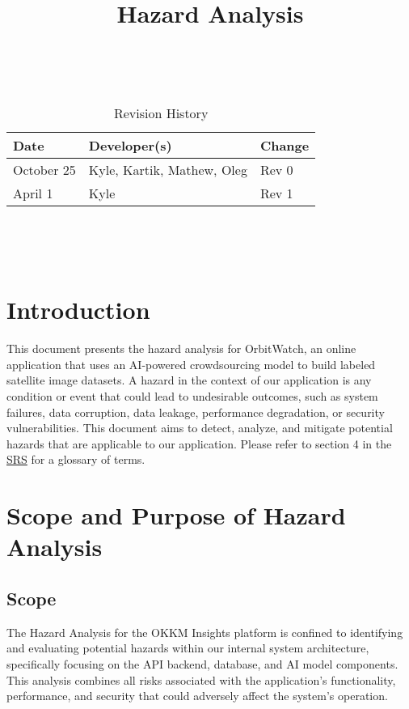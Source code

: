 \documentclass{article}
\title{Hazard Analysis\\\progname}
\author{\authname}
\date{}
\begin{document}
\maketitle
\thispagestyle{empty}

~\newpage


\begin{table}[hp]
\caption{Revision History} \label{TblRevisionHistory}
\begin{tabularx}{\textwidth}{llX}
\toprule
\textbf{Date} & \textbf{Developer(s)} & \textbf{Change}\\
\midrule
October 25 & Kyle, Kartik, Mathew, Oleg & Rev 0\\
April 1 & Kyle & Rev 1\\
\bottomrule
\end{tabularx}
\end{table}

~\newpage

\tableofcontents

~\newpage



\section{Introduction}
This document presents the hazard analysis for OrbitWatch, an online application that uses an AI-powered crowdsourcing model to build labeled satellite image datasets.
A hazard in the context of our application is any condition or event that could lead to undesirable outcomes, such as system failures, data corruption, data leakage, performance degradation, or security vulnerabilities.
This document aims to detect, analyze, and mitigate potential hazards that are applicable to our application.
Please refer to section 4 in the \href{https://github.com/OKKM-insights/OKKM.insights/blob/main/docs/SRS/SRS.pdf}{SRS} for a glossary of terms.
\section{Scope and Purpose of Hazard Analysis}

\subsection{Scope}
The Hazard Analysis for the OKKM Insights platform is confined to identifying and evaluating potential hazards within our internal system architecture, specifically focusing on the API backend, database, and AI model components. This analysis combines all risks associated with the application's functionality, performance, and security that could adversely affect the system's operation.
\end{document}
